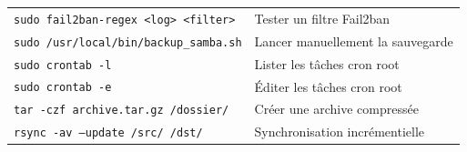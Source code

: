 \documentclass[12pt,a4paper]{article}
\begin{document}
\begin{longtable}{ll}
  \texttt{sudo fail2ban-regex <log> <filter>} & Tester un filtre Fail2ban \\
  \texttt{sudo /usr/local/bin/backup\_samba.sh} & Lancer manuellement la sauvegarde \\
  \texttt{sudo crontab -l} & Lister les tâches cron root \\
  \texttt{sudo crontab -e} & Éditer les tâches cron root \\
  \texttt{tar -czf archive.tar.gz /dossier/} & Créer une archive compressée \\
  \texttt{rsync -av --update /src/ /dst/} & Synchronisation incrémentielle \\
  \bottomrule
\end{longtable}
\end{document}
